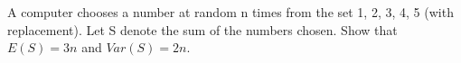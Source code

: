 	
	\item 

A computer chooses a number at random n times from the set {1, 2, 3, 4, 5} (with replacement). 
Let S denote the sum of the numbers chosen. Show that
	$E(S) = 3n$ and $Var(S) = 2n$.

